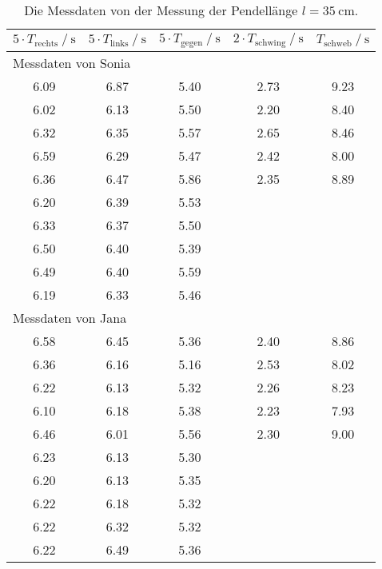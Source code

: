  \begin{table}
    \centering
    \caption{Die Messdaten von der Messung der Pendellänge $l = \SI{35}{\centi\metre}$.}
    \label{tab:35cm}
    \begin{tabular}{c c c c c}
      \toprule
      $ 5 \cdot T_{\text{rechts}} \mathbin{/} \si{\second} $ & $ 5 \cdot T_{\text{links}} \mathbin{/} \si{\second} $ & $ 5 \cdot T_{\text{gegen}} \mathbin{/} \si{\second} $ &
      $ 2 \cdot T_{\text{schwing}} \mathbin{/} \si{\second} $ & $ T_{\text{schweb}} \mathbin{/} \si{\second} $\\
      \midrule
      \multicolumn{5}{l}{Messdaten von Sonia}\\
      \midrule
      6.09 &  6.87 &   5.40 &   2.73 &   9.23   \\
      6.02 &  6.13 &   5.50 &   2.20 &   8.40   \\
      6.32 &  6.35 &   5.57 &   2.65 &   8.46   \\
      6.59 &  6.29 &   5.47 &   2.42 &   8.00   \\
      6.36 &  6.47 &   5.86 &   2.35 &   8.89   \\
      6.20 &  6.39 &   5.53 &        &          \\
      6.33 &  6.37 &   5.50 &        &          \\
      6.50 &  6.40 &   5.39 &        &          \\
      6.49 &  6.40 &   5.59 &        &          \\
      6.19 &  6.33 &   5.46 &        &          \\
      \midrule
      \multicolumn{5}{l}{Messdaten von Jana}\\
      \midrule
      6.58 &  6.45 &   5.36 &   2.40 &   8.86   \\
      6.36 &  6.16 &   5.16 &   2.53 &   8.02   \\
      6.22 &  6.13 &   5.32 &   2.26 &   8.23   \\
      6.10 &  6.18 &   5.38 &   2.23 &   7.93   \\
      6.46 &  6.01 &   5.56 &   2.30 &   9.00   \\
      6.23 &  6.13 &   5.30 &        &          \\
      6.20 &  6.13 &   5.35 &        &          \\
      6.22 &  6.18 &   5.32 &        &          \\
      6.22 &  6.32 &   5.32 &        &          \\
      6.22 &  6.49 &   5.36 &        &          \\
      \bottomrule
    \end{tabular}
  \end{table}

